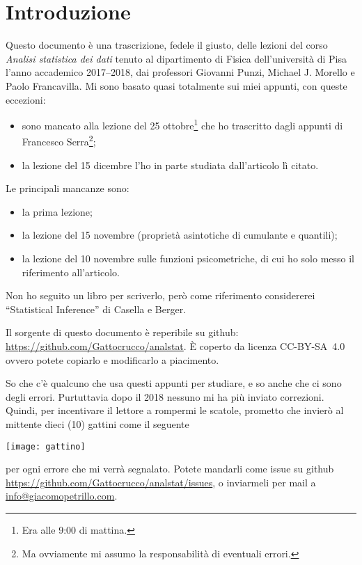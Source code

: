 
\chapter*{Introduzione}

Questo documento è una trascrizione, fedele il giusto,
delle lezioni del corso \emph{Analisi statistica dei dati}
tenuto al dipartimento di Fisica dell'università di Pisa
l'anno accademico 2017--2018,
dai professori Giovanni Punzi, Michael J. Morello e Paolo Francavilla.
Mi sono basato quasi totalmente sui miei appunti,
con queste eccezioni:
\begin{itemize}
	\item sono mancato alla lezione del 25 ottobre\footnote{Era alle 9:00 di mattina.} che ho trascritto dagli appunti di Francesco Serra\footnote{Ma ovviamente mi assumo la responsabilità di eventuali errori.};
	\item la lezione del 15 dicembre l'ho in parte studiata dall'articolo lì citato.
\end{itemize}
Le principali mancanze sono:
\begin{itemize}
	\item la prima lezione;
	\item la lezione del 15 novembre (proprietà asintotiche di cumulante e quantili);
	\item la lezione del 10 novembre sulle funzioni psicometriche,
	di cui ho solo messo il riferimento all'articolo. 
\end{itemize}
%
Non ho seguito un libro per scriverlo, però come riferimento considererei
``Statistical Inference'' di Casella e Berger.

Il sorgente di questo documento è reperibile su github:
\url{https://github.com/Gattocrucco/analstat}. È coperto da licenza
CC-BY-SA~4.0 ovvero potete copiarlo e modificarlo a piacimento.

So che c'è qualcuno che usa questi appunti per studiare, e so anche che ci sono
degli errori. Purtuttavia dopo il 2018 nessuno mi ha più inviato correzioni.
Quindi, per incentivare il lettore a rompermi le scatole, prometto che invierò
al mittente dieci (10) gattini come il seguente
%
\begin{center}
    \texttt{[image: gattino]}
\end{center}
%
per ogni errore che mi verrà segnalato. Potete mandarli come issue su github
\url{https://github.com/Gattocrucco/analstat/issues}, o inviarmeli per mail a
\href{mailto:info@giacomopetrillo.com}{info@giacomopetrillo.com}.

